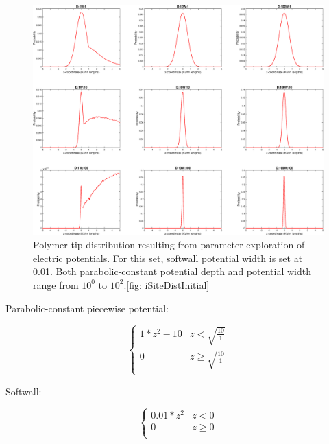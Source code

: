 \documentclass[../../AdvancementSummary.tex]{subfiles}
\begin{document}
\begin{figure}[H]
\begin{center}
\includegraphics[width=0.8\linewidth]{ResultsFigures/CD3ZetaSoftwallPiecewiseBasicsY/DistributioniSite7.eps}
\end{center}
\caption{Polymer tip distribution resulting from parameter exploration of electric potentials. For this set, softwall potential width is set at 0.01. Both parabolic-constant potential depth and potential width range from $10^0$ to $10^{2}$.\ref{fig: iSiteDistInitial}}
\end{figure}

Parabolic-constant piecewise potential:

\begin{equation}\label{eq: parabolaconstant}
\begin{cases}
1*z^2-10 	& z<\sqrt{\frac{10}{1}}\\
0 & z \geq \sqrt{\frac{10}{1}} \\
\end{cases}
\end{equation}


Softwall:

\begin{equation}\label{eq: softwall}
\begin{cases}
0.01*z^2 	& z < 0\\
0 & z \geq 0 \\
\end{cases}
\end{equation}
\end{document}
